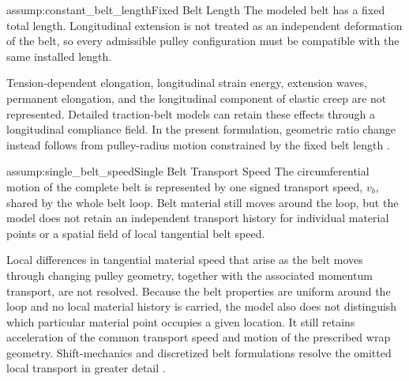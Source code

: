 \documentclass[11pt]{report}
\numberwithin{equation}{section}
\newcounter{assump}
\begin{document}
\begin{assumptionblock}{assump:constant_belt_length}{Fixed Belt Length}
The modeled belt has a fixed total length. Longitudinal extension is not
treated as an independent deformation of the belt, so every admissible pulley
configuration must be compatible with the same installed length.

\AssumptionConsequences
Tension-dependent elongation, longitudinal strain energy, extension waves,
permanent elongation, and the longitudinal component of elastic creep are not
represented. Detailed traction-belt models can retain these effects through a
longitudinal compliance field. In the present formulation, geometric ratio
change instead follows from pulley-radius motion constrained by the fixed belt
length
\citep{Gerbert1996,KongParker2005,Messick2018}.
\end{assumptionblock}

\begin{assumptionblock}{assump:single_belt_speed}{Single Belt Transport Speed}
The circumferential motion of the complete belt is represented by one signed
transport speed, \(v_b\), shared by the whole belt loop. Belt material still
moves around the loop, but the model does not retain an independent transport
history for individual material points or a spatial field of local tangential
belt speed.

\AssumptionConsequences
Local differences in tangential material speed that arise as the belt moves
through changing pulley geometry, together with the associated momentum
transport, are not resolved. Because the belt properties are uniform around
the loop and no local material history is carried, the model also does not
distinguish which particular material point occupies a given location. It
still retains acceleration of the common transport speed and motion of the
prescribed wrap geometry. Shift-mechanics and discretized belt formulations
resolve the omitted local transport in greater detail
\citep{Sorge2008,CammalleriSorge2009,JulioPlante2011}.
\end{assumptionblock}
\end{document}
